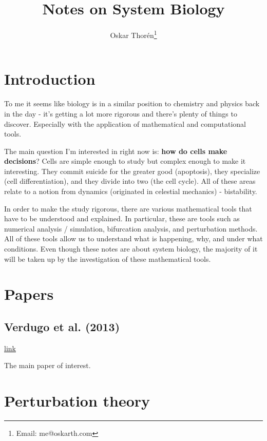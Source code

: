 \documentclass[12pt]{report}
\newcommand{\link}[2]{\href{#1}{#2}}
\begin{document}
\title{Notes on System Biology}
\author{Oskar Thor{\'e}n\thanks{Email: me@oskarth.com}}

\maketitle

\chapter{Introduction}

To me it seems like biology is in a similar position to chemistry and
physics back in the day - it's getting a lot more rigorous and there's
plenty of things to discover. Especially with the application of
mathematical and computational tools.

The main question I'm interested in right now is: \textbf{how do cells
  make decisions}? Cells are simple enough to study but complex enough
to make it interesting. They commit suicide for the greater good
(apoptosis), they specialize (cell differentiation), and they divide
into two (the cell cycle). All of these areas relate to a notion from
dynamics (originated in celestial mechanics) - bistability.

In order to make the study rigorous, there are various mathematical
tools that have to be understood and explained. In particular, these
are tools such as numerical analysis / simulation, bifurcation
analysis, and perturbation methods. All of these tools allow us to
understand what is happening, why, and under what conditions. Even
though these notes are about system biology, the majority of it will
be taken up by the investigation of these mathematical tools.

\chapter{Papers}

\section{Verdugo et al. (2013)}

\link{http://rsob.royalsocietypublishing.org/content/royopenbio/3/3/120179.full.pdf}{link}

The main paper of interest.

\chapter{Perturbation theory}
\end{document}
